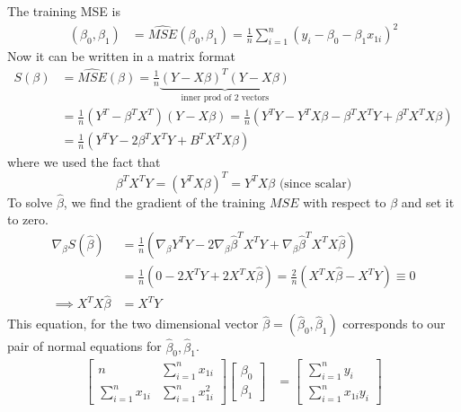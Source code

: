 \documentclass[12 pt]{article}
\begin{document}
The training MSE is
\begin{align*}
(\beta_0, \beta_1) & = \widehat{MSE}(\beta_0, \beta_1) = \frac{1}{n}\sum_{i=1}^n(y_i - \beta_0 - \beta_1 x_{1i})^2
\end{align*}
Now it can be written in a matrix format
\begin{align*}
  S(\beta) & = \widehat{MSE}(\beta) = \frac{1}{n} \underbrace{(Y - X
             \beta)^T (Y - X \beta)}_{\text{inner prod of 2 vectors}}
  \\ & = \frac{1}{n}(Y^T - \beta^TX^T)(Y - X \beta) = \frac{1}{n}(Y^TY - Y^T X \beta-\beta^TX^TY + \beta^TX^TX\beta)
  \\ & = \frac{1}{n} (Y^TY - 2\beta^TX^TY + B^TX^TX\beta)
\end{align*}
where we used the fact that $$\beta^TX^TY = (Y^TX \beta)^T = Y^TX
\beta \text{ (since scalar)}$$
To solve $\hat{\beta}$, we find the gradient of the training $MSE$
with respect to $\beta$ and set it to zero.
\begin{align*}
  \nabla_\beta S(\hat{\beta}) & = \frac{1}{n} (\nabla_\beta Y^TY - 2 \nabla_\beta \hat{\beta}^TX^TY + \nabla_\beta \hat{\beta}^T X^T X \hat{\beta})
  \\ & = \frac{1}{n} (0 - 2X^T Y + 2X^T X \hat{\beta}) = \frac{2}{n} (X^TX\hat{\beta} - X^TY) \equiv 0
  \\ \implies X^TX\hat{\beta} & = X^T Y
\end{align*}
This equation, for the two dimensional vector $\hat{\beta} =
(\hat{\beta}_0, \hat{\beta}_1)$ corresponds to our pair of normal
equations for $\hat{\beta}_0, \hat{\beta}_1$.
\begin{align*}
  \begin{bmatrix}
    n & \sum_{i=1}^n x_{1i}
    \\ \sum_{i=1}^n x_{1i} & \sum_{i=1}^n x_{1i}^2
  \end{bmatrix}
                             \begin{bmatrix}
                               \beta_0 \\ \beta_1
                             \end{bmatrix} & =
                                             \begin{bmatrix}
                                               \sum_{i=1}^n y_i
                                               \\ \sum_{i=1}^nx_{1i}y_i
                                             \end{bmatrix}
\end{align*}
\end{document}

